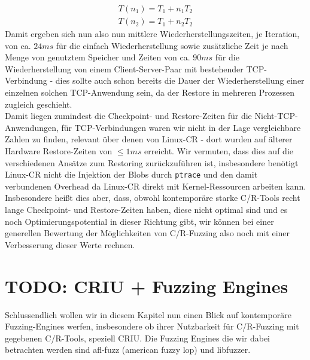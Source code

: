 \documentclass[a4paper]{article}
\begin{document}
\begin{equation}
    \begin{split}
    T(n_1) = T_1 + n_1 T_2 \\
    T(n_2) = T_1 + n_2 T_2
    \end{split}
\end{equation}
Damit ergeben sich nun also nun mittlere Wiederherstellungszeiten, je Iteration, von ca. $24ms$ für die einfach Wiederherstellung sowie zusätzliche Zeit je nach Menge von genutztem Speicher und Zeiten von ca. $90ms$ für die Wiederherstellung von einem Client-Server-Paar mit bestehender TCP-Verbindung - dies sollte auch schon bereits die Dauer der Wiederherstellung einer einzelnen solchen TCP-Anwendung sein, da der Restore in mehreren Prozessen zugleich geschieht.\\
Damit liegen zumindest die Checkpoint- und Restore-Zeiten für die Nicht-TCP-Anwendungen, für TCP-Verbindungen waren wir nicht in der Lage vergleichbare Zahlen zu finden, relevant über denen von Linux-CR - dort wurden auf älterer Hardware Restore-Zeiten von $\leq 1ms$ erreicht. Wir vermuten, dass dies auf die verschiedenen Ansätze zum Restoring zurückzuführen ist, insbesondere benötigt Linux-CR nicht die Injektion der Blobs durch \texttt{ptrace} und den damit verbundenen Overhead da Linux-CR direkt mit Kernel-Ressourcen arbeiten kann. Insbesondere heißt dies aber, dass, obwohl kontemporäre starke C/R-Tools recht lange Checkpoint- und Restore-Zeiten haben, diese nicht optimal sind und es noch Optimierungspotential in dieser Richtung gibt, wir können bei einer generellen Bewertung der Möglichkeiten von C/R-Fuzzing also noch mit einer Verbesserung dieser Werte rechnen.



\section{TODO: CRIU + Fuzzing Engines}
Schlussendlich wollen wir in diesem Kapitel nun einen Blick auf kontemporäre Fuzzing-Engines werfen, insbesondere ob ihrer Nutzbarkeit für C/R-Fuzzing mit gegebenen C/R-Tools, speziell CRIU. Die Fuzzing Engines die wir dabei betrachten werden sind afl-fuzz (american fuzzy lop) und libfuzzer.
\end{document}
